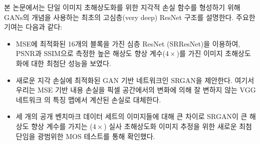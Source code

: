 \documentclass[10pt,twocolumn,letterpaper]{article}
\newcommand{\kor}[1]{#1}
\newcommand{\eng}[1]{}
\newcommand{\summary}[1]{}
\begin{document}
\eng{
In this paper we describe the first very deep \ac{ResNet} \cite{he2015deep,he2016identity} architecture using the concept of \acp{GAN} to form a perceptual loss function for photo-realistic \ac{SISR}. Our main contributions are:
}\kor{
본 논문에서는 \ac{단일 이미지 초해상도화}를 위한 지각적 손실 함수를 형성하기 위해 \acp{GAN}의 개념을 사용하는 최초의 고심층(very deep) \ac{ResNet} \cite{he2015deep,he2016identity} 구조를 설명한다. 주요한 기여는 다음과 같다:
}
\begin{itemize}
\item \eng{
We set a new state of the art for image \ac{SR} with high upscaling factors ($4\times$) as measured by \ac{PSNR} and \ac{SSIM} with our 16 blocks deep \ac{ResNet} (SRResNet) optimized for \ac{MSE}.
}\kor{
\ac{MSE}에 최적화된 16개의 블록을 가진 심층 \ac{ResNet} (SRResNet)을 이용하여, \ac{PSNR}과 \ac{SSIM}으로 측정한 높은 해상도 향상 계수($4\times$)를 가진 이미지 초해상도화에 대한 최첨단 성능을 보였다.
} %
\item \eng{
We propose SRGAN which is a \ac{GAN}-based network optimized for a new perceptual loss. Here we replace the \ac{MSE}-based content loss with a loss calculated on feature maps of the VGG network \cite{simonyan2014very}, which are more invariant to changes in pixel space \cite{Li2016}.
}\kor{
새로운 지각 손실에 최적화된 \ac{GAN} 기반 네트워크인 SRGAN을 제안한다. 여기서 우리는 \ac{MSE} 기반 내용 손실을 픽셀 공간\cite{Li2016}에서의 변화에 의해 잘 변하지 않는 VGG 네트워크 \cite{simonyan2014very}의 특징 맵에서 계산된 손실로 대체한다.
} %
\item \eng{
We confirm with an extensive \ac{MOS} test on images from three public benchmark datasets that SRGAN is the new state of the art, by a large margin, for the estimation of photo-realistic \ac{SR} images with high upscaling factors ($4\times$).
}\kor{
세 개의 공개 벤치마크 데이터 세트의 이미지들에 대해 큰 차이로 SRGAN이 큰 해상도 향상 계수를 가지는 ($4\times$) 실사 \ac{초해상도화} 이미지 추정을 위한 새로운 최첨단임을 광범위한 \ac{MOS} 테스트를 통해 확인했다.
}
\end{itemize}

\summary{
심층 ResNet 구조를 이용한 최첨단 성능의 달성, 새로운 지각 손실에 최적화된 GAN 기반 네트워크인 SRGAN 제시, MOS 테스트를 통한 실사 초해상도 이미지 추정 성능에서의 최첨단 성능 확인
}
\end{document}
